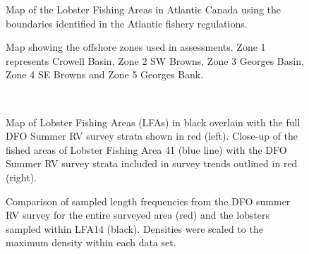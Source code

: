 \documentclass[11pt]{article}
\newcommand{\e}{/backup/bio_data/bio.lobster/figures/} %
\begin{document}
\begin{landscape}
\begin{figure}
\centering
    \caption{Map of the Lobster Fishing Areas in Atlantic Canada using the boundaries identified in the Atlantic fishery regulations.}

\end{figure}
\end{landscape}


\begin{figure}
\centering
    \caption{Map showing the offshore zones used in assessments. Zone 1 represents Crowell Basin, Zone 2 SW Browns, Zone 3 Georges Basin, Zone 4 SE Browns and Zone 5 Georges Bank. 
}

\end{figure}

\begin{landscape}

\begin{figure}
\centering
{}\\
\caption{ Map of Lobster Fishing Areas (LFAs) in black overlain with the full DFO Summer RV survey strata shown in red (left). Close-up of the fished areas of Lobster Fishing Area 41 (blue line) with the DFO Summer RV survey strata included in survey trends outlined in red (right).}
\end{figure}

\end{landscape}

\begin{figure}
\centering
    \caption{Comparison of sampled length frequencies from the DFO summer RV survey for the entire surveyed area (red) and the lobsters sampled within LFA14 (black). Densities were scaled to the maximum density within each data set.}
\end{figure}
\end{document}
